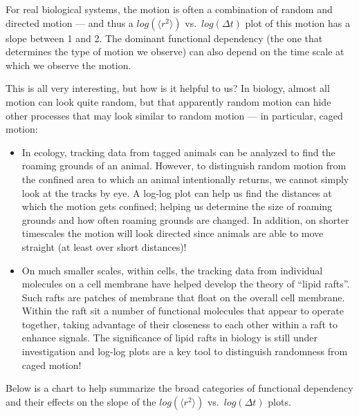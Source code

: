  \par
For real biological systems, the motion is often a combination of random and directed motion — and thus a $log(\langle r^{2} \rangle)$ vs.\ $log(\Delta t)$ plot of this motion has a slope between 1 and 2. 
The dominant functional dependency (the one that determines the type of motion we observe) can also depend on the time scale at which we observe the motion.
\par
This is all very interesting, but how is it helpful to us?
In biology, almost all motion can look quite random, but that apparently random motion can hide other processes that may look similar to random motion — in particular, caged motion:
\begin{itemize}
\item In ecology, tracking data from tagged animals can be analyzed to find the roaming grounds of an animal. However, to distinguish random motion from the confined area to which an animal intentionally returns, we cannot simply look at the tracks by eye. A log-log plot can help us find the distances at which the motion gets confined; helping us determine the size of roaming grounds and how often roaming grounds are changed. In addition, on shorter timescales the motion will look directed since animals are able to move straight (at least over short distances)!
\item On much smaller scales, within cells, the tracking data from individual molecules on a cell membrane have helped develop the theory of ``lipid rafts''. Such rafts are patches of membrane that float on the overall cell membrane. Within the raft sit a number of functional molecules that appear to operate together, taking advantage of their closeness to each other within a raft to enhance signals. The significance of lipid rafts in biology is still under investigation and log-log plots are a key tool to distinguish randomness from caged motion!
\end{itemize}
%
Below is a chart to help summarize the broad categories of functional dependency and their effects on the slope of the $log(\langle r^{2} \rangle)$ vs.\ $log(\Delta t)$ plots.

